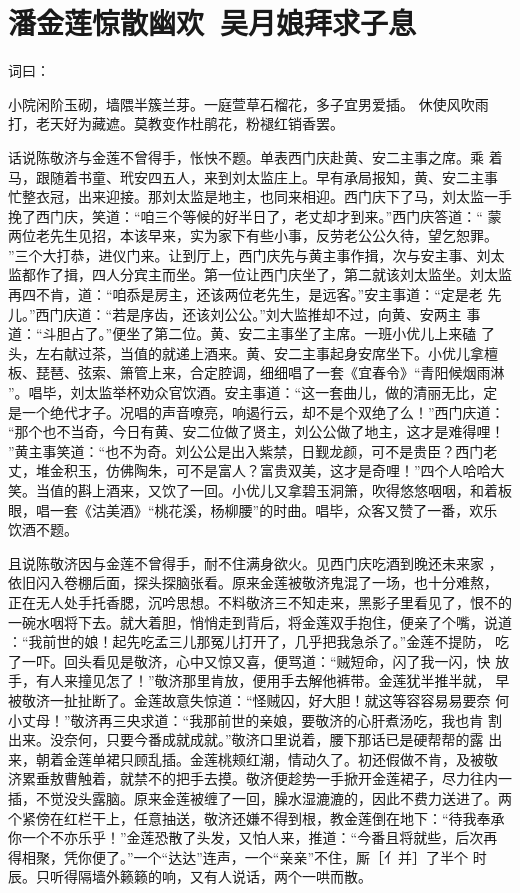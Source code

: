 \chapter{潘金莲惊散幽欢~吴月娘拜求子息}

词曰：

小院闲阶玉砌，墙隈半簇兰芽。一庭萱草石榴花，多子宜男爱插。
休使风吹雨打，老天好为藏遮。莫教变作杜鹃花，粉褪红销香罢。

话说陈敬济与金莲不曾得手，怅怏不题。单表西门庆赴黄、安二主事之席。乘
着马，跟随着书童、玳安四五人，来到刘太监庄上。早有承局报知，黄、安二主事
忙整衣冠，出来迎接。那刘太监是地主，也同来相迎。西门庆下了马，刘太监一手
挽了西门庆，笑道：“咱三个等候的好半日了，老丈却才到来。”西门庆答道：“
蒙两位老先生见招，本该早来，实为家下有些小事，反劳老公公久待，望乞恕罪。
”三个大打恭，进仪门来。让到厅上，西门庆先与黄主事作揖，次与安主事、刘太
监都作了揖，四人分宾主而坐。第一位让西门庆坐了，第二就该刘太监坐。刘太监
再四不肯，道：“咱忝是房主，还该两位老先生，是远客。”安主事道：“定是老
先儿。”西门庆道：“若是序齿，还该刘公公。”刘大监推却不过，向黄、安两主
事道：“斗胆占了。”便坐了第二位。黄、安二主事坐了主席。一班小优儿上来磕
了头，左右献过茶，当值的就递上酒来。黄、安二主事起身安席坐下。小优儿拿檀
板、琵琶、弦索、箫管上来，合定腔调，细细唱了一套《宜春令》“青阳候烟雨淋
”。唱毕，刘太监举杯劝众官饮酒。安主事道：“这一套曲儿，做的清丽无比，定
是一个绝代才子。况唱的声音嘹亮，响遏行云，却不是个双绝了么！”西门庆道：
“那个也不当奇，今日有黄、安二位做了贤主，刘公公做了地主，这才是难得哩！
”黄主事笑道：“也不为奇。刘公公是出入紫禁，日觐龙颜，可不是贵臣？西门老
丈，堆金积玉，仿佛陶朱，可不是富人？富贵双美，这才是奇哩！”四个人哈哈大
笑。当值的斟上酒来，又饮了一回。小优儿又拿碧玉洞箫，吹得悠悠咽咽，和着板
眼，唱一套《沽美酒》“桃花溪，杨柳腰”的时曲。唱毕，众客又赞了一番，欢乐
饮酒不题。

且说陈敬济因与金莲不曾得手，耐不住满身欲火。见西门庆吃酒到晚还未来家
，依旧闪入卷棚后面，探头探脑张看。原来金莲被敬济鬼混了一场，也十分难熬，
正在无人处手托香腮，沉吟思想。不料敬济三不知走来，黑影子里看见了，恨不的
一碗水咽将下去。就大着胆，悄悄走到背后，将金莲双手抱住，便亲了个嘴，说道
：“我前世的娘！起先吃孟三儿那冤儿打开了，几乎把我急杀了。”金莲不提防，
吃了一吓。回头看见是敬济，心中又惊又喜，便骂道：“贼短命，闪了我一闪，快
放手，有人来撞见怎了！”敬济那里肯放，便用手去解他裤带。金莲犹半推半就，
早被敬济一扯扯断了。金莲故意失惊道：“怪贼囚，好大胆！就这等容容易易要奈
何小丈母！”敬济再三央求道：“我那前世的亲娘，要敬济的心肝煮汤吃，我也肯
割出来。没奈何，只要今番成就成就。”敬济口里说着，腰下那话已是硬帮帮的露
出来，朝着金莲单裙只顾乱插。金莲桃颊红潮，情动久了。初还假做不肯，及被敬
济累垂敖曹触着，就禁不的把手去摸。敬济便趁势一手掀开金莲裙子，尽力往内一
插，不觉没头露脑。原来金莲被缠了一回，臊水湿漉漉的，因此不费力送进了。两
个紧傍在红栏干上，任意抽送，敬济还嫌不得到根，教金莲倒在地下：“待我奉承
你一个不亦乐乎！”金莲恐散了头发，又怕人来，推道：“今番且将就些，后次再
得相聚，凭你便了。”一个“达达”连声，一个“亲亲”不住，厮［亻并］了半个
时辰。只听得隔墙外籁籁的响，又有人说话，两个一哄而散。

